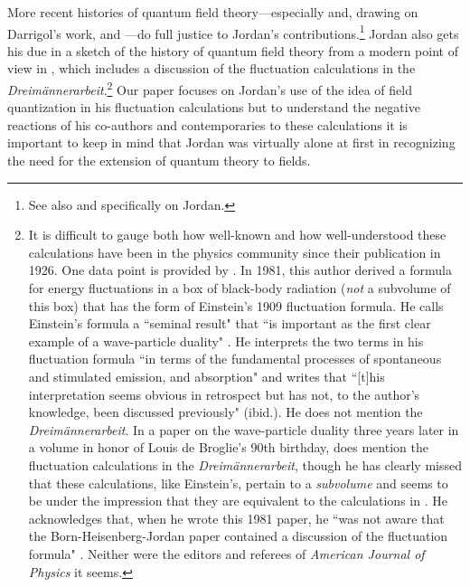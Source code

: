 \documentclass[12pt]{elsart}
\begin{document}
More recent histories of quantum field theory---especially \citep{Darrigol 1986} and, drawing on Darrigol's work, \citep{Miller 1994} and \citep{Schweber 1994}---do full justice to Jordan's contributions.\footnote{See also \citep{Ehlers 2007} and \citep{Schroer 2007} specifically on Jordan.} Jordan also gets his due in a sketch of the history of quantum field theory from a modern point of view in \citep[sec.\ 1.2, pp.\ 15--31]{Weinberg 1995}, which includes a discussion of the fluctuation calculations in the {\it Dreim\"annerarbeit}.\footnote{\label{milonni}It is difficult to gauge both how well-known and how well-understood these calculations have been in the physics community since their publication in 1926. One data point is provided by \citep{Milonni 1981, Milonni 1984}. In 1981, this author derived a formula for energy fluctuations in a box of black-body radiation ({\it not} a subvolume of this box) that has the form of Einstein's 1909 fluctuation formula. He calls Einstein's formula a ``seminal result" that ``is important as the first clear example of a wave-particle duality" \citep[p.\ 177; the author cites \citep{Pais 1979} in this context (cf.\ note \ref{pais})]{Milonni 1981}.  He interprets the two terms in his fluctuation formula ``in terms of the fundamental processes of spontaneous and stimulated emission, and absorption" and writes that ``[t]his interpretation seems obvious in retrospect but has not, to the author's knowledge, been discussed previously" (ibid.). He does not mention the {\it Dreim\"annerarbeit}. In a paper on the wave-particle duality three years later in a volume in honor of Louis de Broglie's 90th birthday, \citet[pp.\ 39--41]{Milonni 1984} does mention the fluctuation calculations in the {\it Dreim\"annerarbeit}, though he has clearly missed that these calculations, like Einstein's, pertain to a {\it subvolume} and seems to be under the impression that they are equivalent to the calculations in \citep{Milonni 1981}. He acknowledges that, when he wrote this 1981 paper, he ``was not aware that the Born-Heisenberg-Jordan paper contained a discussion of the fluctuation formula" \citep[p. 62, note 27]{Milonni 1984}. Neither were the editors and referees of {\it American Journal of Physics} it seems.}  Our paper focuses on Jordan's use of the idea of field quantization in his fluctuation calculations but to understand the negative reactions of his co-authors and contemporaries to these calculations it is important to keep in mind that Jordan was virtually alone at first in recognizing the need for the extension of quantum theory to fields.
\end{document}
